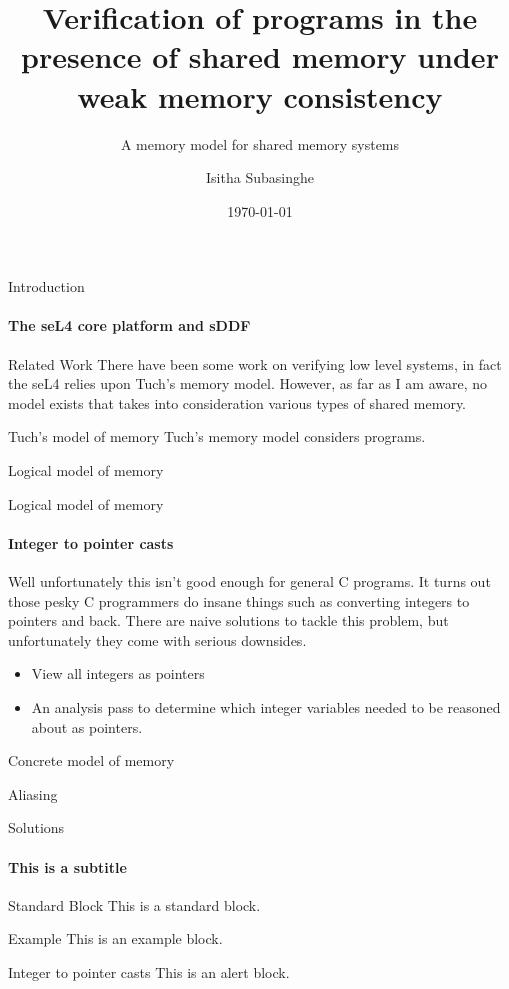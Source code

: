 \documentclass[aspectratio=169]{beamer}
\author{Isitha Subasinghe}
\title{Verification of programs in the presence of shared memory under weak memory consistency}
\subtitle{A memory model for shared memory systems}
\institute{School of Computer Science and Engineering}
\date{\today}
\begin{document}
	\begin{frame}[plain]
		\titlepage
	\end{frame}
	
	\begin{frame}{Introduction}
    \framesubtitle{The seL4 core platform and sDDF}  
	\end{frame}

  \begin{frame}{Related Work}
    There have been some work on verifying low level systems, in fact the seL4 relies upon Tuch's memory model. 
    However, as far as I am aware, no model exists that takes into consideration various types of shared memory. 
  \end{frame}

  \begin{frame}{Tuch's model of memory}
    Tuch's \cite{tuch2007types} memory model considers programs.  
  \end{frame}

  \begin{frame}{Logical model of memory}
  \end{frame}
  
  \begin{frame}{Logical model of memory}
    \framesubtitle{Integer to pointer casts}
    Well unfortunately this isn't good enough for general C programs. It turns out those pesky C programmers do insane things such as 
    converting integers to pointers and back. There are naive solutions to tackle this problem, but unfortunately they come with serious downsides. 
    \begin{itemize}
      \item View all integers as pointers
      \item An analysis pass to determine which integer variables needed to be reasoned about as pointers. 
    \end{itemize}
  \end{frame}

  \begin{frame}{Concrete model of memory}
  \end{frame}

  \begin{frame}{Aliasing}

  \end{frame}

	\begin{frame}{Solutions}
		\framesubtitle{This is a subtitle}
		\begin{block}{Standard Block}
			This is a standard block.
		\end{block}
		
		\begin{exampleblock}{Example}
			This is an example block.
		\end{exampleblock}
		
    \begin{alertblock}{Integer to pointer casts}
			This is an alert block.
		\end{alertblock}
	\end{frame}
\end{document}
